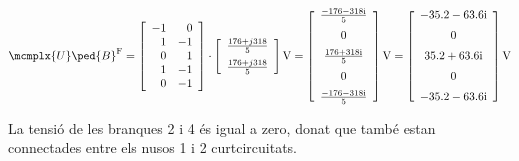 \begin{exemple}
    \[
     \mcmplx{U}\ped{B}^{\text{F}} =
     \begin{bmatrix}\begin{array}{rr}
        -1 & 0 \\ 1  & -1 \\  0 & 1 \\ 1 & -1 \\ 0 & -1
	 \end{array}\end{bmatrix}  \cdot
     \begin{bmatrix}\begin{array}{c}
        \frac{176 + j 318}{5} \\[2mm]
        \frac{176 + j 318}{5}
    \end{array}\end{bmatrix}\unit{V} =
    \begin{bmatrix}\begin{array}{c}
        \frac{\complexnum{-176 - j 318}}{5} \\[2mm]
        0  \\[2mm]
        \frac{\complexnum{176 + j 318}}{5} \\[2mm]
        0  \\[2mm]
        \frac{\complexnum{ -176 - j 318}}{5}
	\end{array}\end{bmatrix}\unit{V} =
	\begin{bmatrix}\begin{array}{c}
        \complexnum{-35,2 - j 63,6} \\[2mm]
        0  \\[2mm]
        \complexnum{35,2 + j 63,6} \\[2mm]
        0  \\[2mm]
        \complexnum{-35,2 - j 63,6}
	\end{array}\end{bmatrix}\unit{V}
    \]

    La tensió de les branques 2 i 4 és igual a zero, donat que també estan connectades entre els nusos 1 i 2 curtcircuitats.


\end{exemple}
